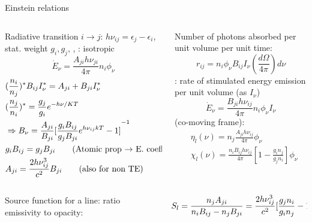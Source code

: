 \begin{frame}{Einstein relations}
    \begin{columns}[T]
        \begin{column}{0.5\textwidth}
            Radiative transition $i\to j$: $h\nu_{ij}=\epsilon_j-\epsilon_i$, stat. weight $g_i, g_j$, , : isotropic
            \[\dot{E}_{\nu}=\frac{A_{ji}h\nu_{ji}}{4\pi}n_i\phi_{\nu}\]
            \begin{align*}
                &(\frac{n_i}{n_j})^*B_{ij}I_{\nu}^*=A_{ji}+B_{ji}I_{\nu}^*\label{CR and TE}\\
                &(\frac{n_j}{n_i})^*=\frac{g_j}{g_i}e^{-h\nu/KT}\\
                &\Rightarrow B_{\nu}=\frac{A_{ji}}{B_{ji}}{[\frac{g_iB_{ij}}{g_jB_{ji}}e^{h\nu_{ij}kT}-1]}^{-1}\\
                &g_iB_{ij}=g_jB_{ji}\tag{Atomic prop $\to$ E. coeff}\\
                &A_{ji}=\frac{2h\nu_{ij}^3}{c^2}B_{ji}\tag{also for non TE}
            \end{align*}
        \end{column}
        \begin{column}{0.5\textwidth}
            Number of photons absorbed per unit volume per unit time:
            \[r_{ij}=n_i\phi_{\nu}B_{ij}I_{\nu}(\frac{d\Omega}{4\pi})d\nu\]
            : rate of stimulated energy emission per unit volume (as $I_{\nu}$)
            \[\dot{E}_{\nu}=\frac{B_{ji}h\nu_{ij}}{4\pi}n_i\phi_{\nu}I_{\nu}\]
             (co-moving frame):
            \begin{align*}
    &\eta_l(\nu)=n_j\frac{A_{ji}h\nu_{ij}}{4\pi}\phi_{\nu}\\
    &\chi_l(\nu)=\frac{n_iB_{ij}h\nu_{ij}}{4\pi}[1-\frac{g_in_j}{g_jn_i}]\phi_{\nu}
            \end{align*}
        \end{column}
    \end{columns}
    \begin{columns}[T]
        \begin{column}{0.4\textwidth}
             Source function for a line: ratio emissivity to opacity:
        \end{column}
        \begin{column}{0.6\textwidth}
            \[S_l=\frac{n_jA_{ji}}{n_iB_{ij}-n_jB_{ji}}=\frac{2h\nu_{ij}^3}{c^2}{[\frac{g_jn_i}{g_in_j}-1]}^{-1}\to B_{\nu}\]
        \end{column}
    \end{columns}
\end{frame}

